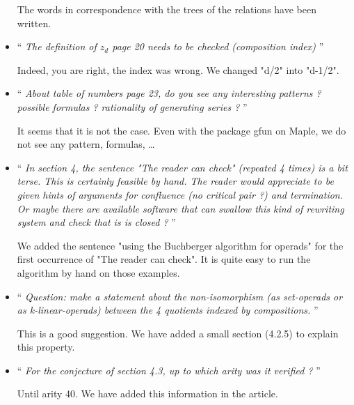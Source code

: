 \documentclass[11pt,reqno]{amsart}
\numberwithin{equation}{subsection}
\begin{document}
\begin{itemize}
The words in correspondence with the trees of the relations have been
written.
\medbreak

\item `` {\it
The definition of $z_d$ page 20 needs to be checked (composition index)
}''
\smallbreak

Indeed, you are right, the index was wrong. We changed "d/2" into
"d-1/2".
\medbreak

\item `` {\it
About table of numbers page 23, do you see any interesting patterns ?
possible formulas ? rationality of generating series ?
}''
\smallbreak

It seems that it is not the case. Even with the package gfun on
Maple, we do not see any pattern, formulas, \dots
\medbreak

\item `` {\it
In section 4, the sentence "The reader can check" (repeated 4 times)
is a bit terse. This is certainly feasible by hand. The reader would
appreciate to be given hints of arguments for confluence (no critical
pair ?) and termination. Or maybe there are available software that
can swallow this kind of rewriting system and check that is is closed ?
}''
\smallbreak

We added the sentence "using the Buchberger algorithm for operads" for 
the first occurrence of "The reader can check". It is quite easy to run 
the algorithm by hand on those examples.
\medbreak

\item `` {\it
Question: make a statement about the non-isomorphism (as set-operads
or as k-linear-operads) between the 4 quotients indexed by compositions.
}''
\smallbreak

This is a good suggestion. We have added a small section (4.2.5) to
explain this property.
\medbreak

\item `` {\it
For the conjecture of section 4.3, up to which arity was it verified ?
}''
\smallbreak

Until arity 40. We have added this information in the article.
\medbreak

\end{itemize}
\end{document}
